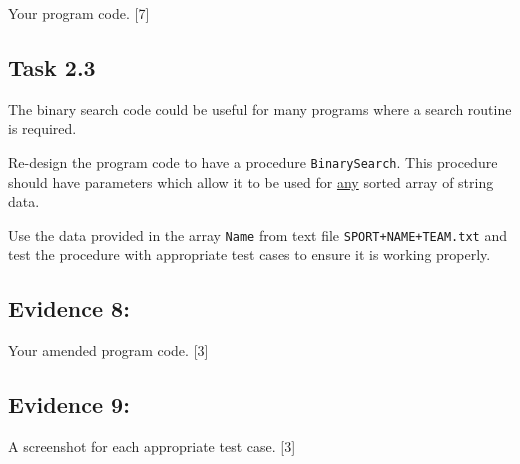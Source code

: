 Your program code. \hfill{}{[}7{]}

\subsection*{Task 2.3 }

The binary search code could be useful for many programs where a search
routine is required. 

Re-design the program code to have a procedure \texttt{BinarySearch}.
This procedure should have parameters which allow it to be used for
\uline{any} sorted array of string data. 

Use the data provided in the array \texttt{Name} from text file \texttt{SPORT+NAME+TEAM.txt}
and test the procedure with appropriate test cases to ensure it is
working properly. 

\subsection*{Evidence 8: }

Your amended program code. \hfill{}{[}3{]}

\subsection*{Evidence 9: }

A screenshot for each appropriate test case. \hfill{}{[}3{]}